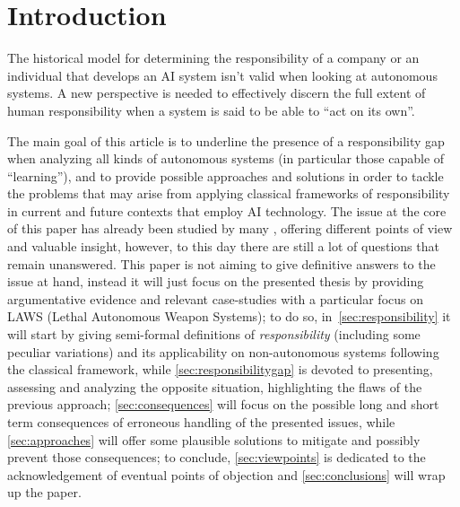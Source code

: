 \section{Introduction}\label{sec:introduction}

The historical model for determining the responsibility of a company or an individual that develops an AI system isn't valid when looking at autonomous systems.
A new perspective is needed to effectively discern the full extent of human responsibility when a system is said to be able to ``act on its own''.

The main goal of this article is to underline the presence of a responsibility gap \parencite{MATTRG} when analyzing all kinds of autonomous systems (in particular those capable of ``learning''), and to provide possible approaches and solutions in order to tackle the problems that may arise from applying classical frameworks of responsibility in current and future contexts that employ AI technology.
The issue at the core of this paper has already been studied by many \parencite{MATTRG, SANFRG, COEAIR, NOVAIA}, offering different points of view and valuable insight, however, to this day there are still a lot of questions that remain unanswered.
This paper is not aiming to give definitive answers to the issue at hand, instead it will just focus on the presented thesis by providing argumentative evidence and relevant case-studies with a particular focus on LAWS (Lethal Autonomous Weapon Systems); to do so, in~\autoref{sec:responsibility} it will start by giving semi-formal definitions of \textit{responsibility} (including some peculiar variations) and its applicability on non-autonomous systems following the classical framework, while \autoref{sec:responsibilitygap} is devoted to presenting, assessing and analyzing the opposite situation, highlighting the flaws of the previous approach; \autoref{sec:consequences} will focus on the possible long and short term consequences of erroneous handling of the presented issues, while \autoref{sec:approaches} will offer some plausible solutions to mitigate and possibly prevent those consequences; to conclude, \autoref{sec:viewpoints} is dedicated to the acknowledgement of eventual points of objection and \autoref{sec:conclusions} will wrap up the paper.